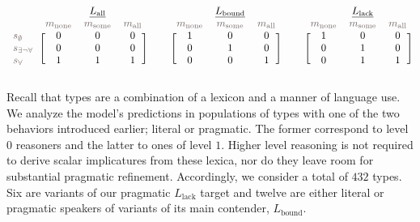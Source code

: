 \documentclass[a4paper, 11pt]{article}
\newcommand{\state}{\ensuremath{s}\xspace}		%
\newcommand{\mystate}[1]{\ensuremath{\state_{\text{#1}}}\xspace} %
\newcommand{\mylang}[1]{\ensuremath{L_{\text{#1}}}\xspace} %
\newcommand{\messg}{\ensuremath{m}\xspace}		%
\newcommand{\mymessg}[1]{\ensuremath{\messg_{\text{#1}}}\xspace} %
\newcommand{\ssome}{\mystate{\ensuremath{\exists\neg\forall}}}
\newcommand{\sall}{\mystate{\ensuremath{\forall}}}
\newcommand{\snone}{\mystate{\ensuremath{\emptyset}}}
\newcommand{\msome}{\mymessg{some}}
\newcommand{\mall}{\mymessg{all}}
\newcommand{\mnone}{\mymessg{none}}
\newcommand{\Lall}{\mylang{all}}
\newcommand{\Lbound}{\mylang{bound}}
\newcommand{\Llack}{\mylang{lack}}
\newcommand{\mygray}[1]{{\textcolor{mygray}{#1}}}
\begin{document}
\begin{align*}
  \begin{blockarray}{lccc}
    & & \underline{\Lall} & \\
    & \mygray{\mnone} & \mygray{\msome} & \mygray{\mall} \\
    \begin{block}{l[ccc]}
     \mygray{\snone}  & 0 & 0 & 0\\
     \mygray{\ssome}  & 0 & 0 & 0\\
    \mygray{\sall}   & 1 & 1 & 1\\
    \end{block}
  \end{blockarray} & &
 \begin{blockarray}{lccc}
    & & \underline{\Lbound} & \\
    & \mygray{\mnone} & \mygray{\msome} & \mygray{\mall} \\
    \begin{block}{l[ccc]}
       & 1 & 0 & 0\\
       & 0 & 1 & 0\\
       & 0 & 0 & 1\\
    \end{block}
  \end{blockarray} & &
  \begin{blockarray}{lccc}
    & & \underline{\Llack} & \\
    & \mygray{\mnone} & \mygray{\msome} & \mygray{\mall} \\
    \begin{block}{l[ccc]}
       & 1 & 0 & 0\\
       & 0 & 1 & 0\\
       & 0 & 1 & 1\\
    \end{block}
  \end{blockarray}
\end{align*}



Recall that types are a combination of a lexicon and a manner of language use. We analyze the model's predictions in populations of types with one of the two behaviors introduced earlier; literal or pragmatic. The former correspond to level $0$ reasoners and the latter to ones of level $1$. Higher level reasoning is not required to derive scalar implicatures from these lexica, nor do they leave room for substantial pragmatic refinement. Accordingly, we consider a total of $432$ types. Six are variants of our pragmatic $\Llack$ target and twelve are either literal or pragmatic speakers of variants of its main contender, $\Lbound$.
\end{document}
